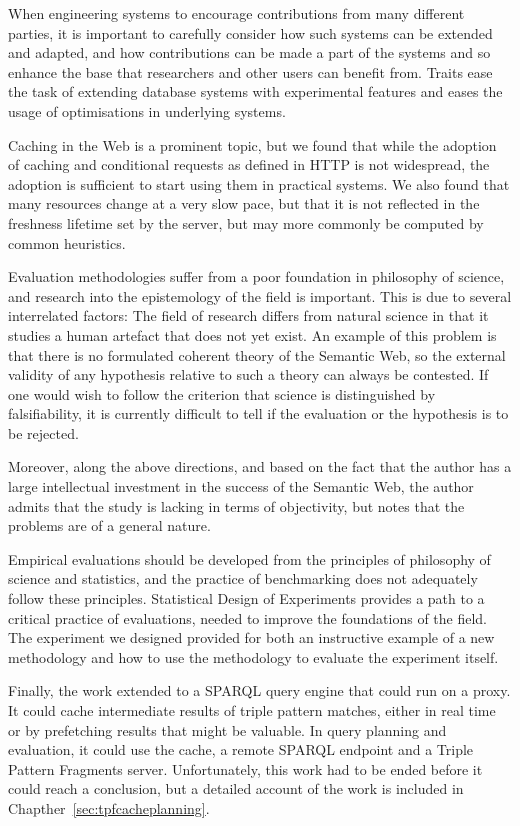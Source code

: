 When engineering systems to encourage contributions from many
different parties, it is important to carefully consider how such
systems can be extended and adapted, and how contributions can be made
a part of the systems and so enhance the base that researchers and
other users can benefit from. Traits ease the task of extending
database systems with experimental features and eases the usage of
optimisations in underlying systems.

Caching in the Web is a prominent topic, but we found that while the
adoption of caching and conditional requests as defined in HTTP is not
widespread, the adoption is sufficient to start using them in
practical systems. We also found that many resources change at a very
slow pace, but that it is not reflected in the freshness lifetime set
by the server, but may more commonly be computed by common heuristics.


Evaluation methodologies suffer from a poor foundation in philosophy
of science, and research into the epistemology of the field is
important. This is due to several interrelated factors: The field of
research differs from natural science in that it studies a human
artefact that does not yet exist. An example of this problem is that
there is no formulated coherent theory of the Semantic Web, so the
external validity of any hypothesis relative to such a theory can
always be contested. If one would wish to follow the criterion that
science is distinguished by falsifiability, it is currently difficult
to tell if the evaluation or the hypothesis is to be rejected.

Moreover, along the above directions, and based on the fact that the
author has a large intellectual investment in the success of the
Semantic Web, the author admits that the study is lacking in terms of
objectivity, but notes that the problems are of a general nature.

Empirical evaluations should be developed from the principles of
philosophy of science and statistics, and the practice of benchmarking
does not adequately follow these principles. Statistical Design of
Experiments provides a path to a critical practice of evaluations,
needed to improve the foundations of the field. The experiment we
designed provided for both an instructive example of a new methodology
and how to use the methodology to evaluate the experiment itself.

Finally, the work extended to a SPARQL query engine that could run on
a proxy. It could cache intermediate results of triple pattern
matches, either in real time or by prefetching results that might be
valuable. In query planning and evaluation, it could use the cache, a
remote SPARQL endpoint and a Triple Pattern Fragments
server. Unfortunately, this work had to be ended before it could reach
a conclusion, but a detailed account of the work is included in
Chapther~\ref{sec:tpfcacheplanning}.
